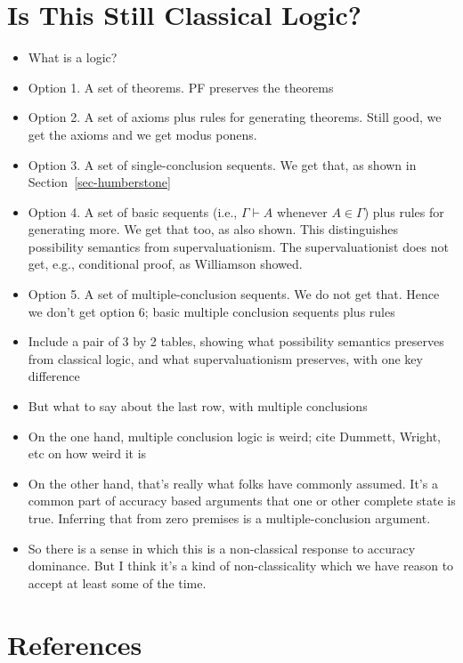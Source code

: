 \documentclass[
  11pt,
  letterpaper,
  DIV=11,
  numbers=noendperiod,
  twoside]{scrartcl}
\providecommand{\tightlist}{%
  \setlength{\itemsep}{0pt}\setlength{\parskip}{0pt}}
\begin{document}
\section{Is This Still Classical Logic?}\label{sec-classical}

\begin{itemize}
\tightlist
\item
  What is a logic?
\item
  Option 1. A set of theorems. PF preserves the theorems
\item
  Option 2. A set of axioms plus rules for generating theorems. Still
  good, we get the axioms and we get modus ponens.
\item
  Option 3. A set of single-conclusion sequents. We get that, as shown
  in Section~\ref{sec-humberstone}
\item
  Option 4. A set of basic sequents (i.e., \(\Gamma \vdash A\) whenever
  \(A \in \Gamma\)) plus rules for generating more. We get that too, as
  also shown. This distinguishes possibility semantics from
  supervaluationism. The supervaluationist does not get, e.g.,
  conditional proof, as Williamson showed.
\item
  Option 5. A set of multiple-conclusion sequents. We do not get that.
  Hence we don't get option 6; basic multiple conclusion sequents plus
  rules
\item
  Include a pair of 3 by 2 tables, showing what possibility semantics
  preserves from classical logic, and what supervaluationism preserves,
  with one key difference
\item
  But what to say about the last row, with multiple conclusions
\item
  On the one hand, multiple conclusion logic is weird; cite Dummett,
  Wright, etc on how weird it is
\item
  On the other hand, that's really what folks have commonly assumed.
  It's a common part of accuracy based arguments that one or other
  complete state is true. Inferring that from zero premises is a
  multiple-conclusion argument.
\item
  So there is a sense in which this is a non-classical response to
  accuracy dominance. But I think it's a kind of non-classicality which
  we have reason to accept at least some of the time.
\end{itemize}

\section*{References}\label{references}
\end{document}

